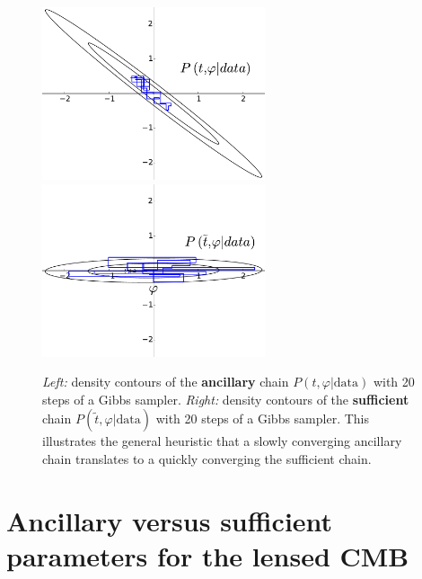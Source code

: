\documentclass[iop,revtex4,apj,onecolumn]{emulateapj}
\begin{document}
\begin{figure}
\begin{center}
\includegraphics[height=2.0in]{figure1a.pdf}
\includegraphics[height=2.0in]{figure1b.pdf}
\end{center}
\caption{\label{fastslowGibbs}
{\em Left:} density contours of the {\bf ancillary} chain $P( t, \varphi|\text{data})$ with 20 steps of a Gibbs sampler. {\em Right:} density contours of the {\bf sufficient}  chain $P(\widetilde  t, \varphi|\text{data})$ with 20 steps of a Gibbs sampler. This illustrates the general heuristic that a slowly converging ancillary chain translates to a quickly converging the sufficient chain.}
\end{figure}
 


	
%
%
\section{Ancillary versus sufficient parameters for the lensed CMB}
\label{Section: Ancillary and sufficient parameters for the lensed CMB}
\end{document}
